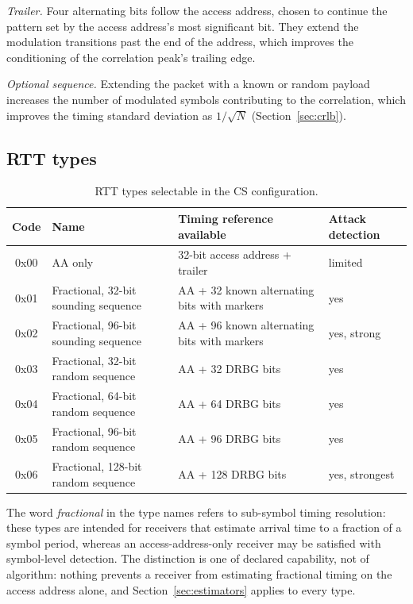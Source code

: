 \documentclass[11pt,a4paper]{article}
\begin{document}
\emph{Trailer.} Four alternating bits follow the access address, chosen to continue the pattern set
by the access address's most significant bit. They extend the modulation transitions past the end
of the address, which improves the conditioning of the correlation peak's trailing edge.

\emph{Optional sequence.} Extending the packet with a known or random payload increases the number
of modulated symbols contributing to the correlation, which improves the timing standard deviation
as $1/\sqrt{N}$ (Section~\ref{sec:crlb}).

\subsection{RTT types}

\begin{table}[h]
\caption{RTT types selectable in the CS configuration.}
\label{tab:rtttype}
\centering\small
\begin{tabular}{@{}clL{56mm}L{28mm}@{}}
\toprule
Code & Name & Timing reference available & Attack detection \\
\midrule
0x00 & AA only & 32-bit access address + trailer & limited \\
0x01 & Fractional, 32-bit sounding sequence & AA + 32 known alternating bits with markers & yes \\
0x02 & Fractional, 96-bit sounding sequence & AA + 96 known alternating bits with markers & yes, strong \\
0x03 & Fractional, 32-bit random sequence & AA + 32 DRBG bits & yes \\
0x04 & Fractional, 64-bit random sequence & AA + 64 DRBG bits & yes \\
0x05 & Fractional, 96-bit random sequence & AA + 96 DRBG bits & yes \\
0x06 & Fractional, 128-bit random sequence & AA + 128 DRBG bits & yes, strongest \\
\bottomrule
\end{tabular}
\end{table}

The word \emph{fractional} in the type names refers to sub-symbol timing resolution: these types
are intended for receivers that estimate arrival time to a fraction of a symbol period, whereas an
access-address-only receiver may be satisfied with symbol-level detection. The distinction is one
of declared capability, not of algorithm: nothing prevents a receiver from estimating fractional
timing on the access address alone, and Section~\ref{sec:estimators} applies to every type.
\end{document}
